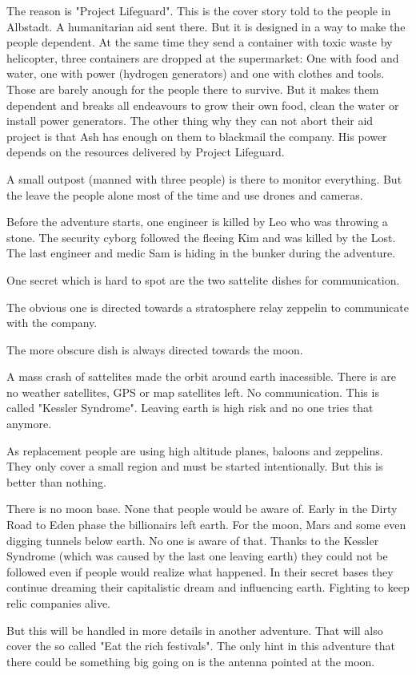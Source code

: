 The reason is "Project Lifeguard". This is the cover story told to the people in Albstadt. A humanitarian aid sent there. But it is designed in a way to make the people dependent. At the same time they send a container with toxic waste by helicopter, three containers are dropped at the supermarket: One with food and water, one with power (hydrogen generators) and one with clothes and tools.
Those are barely anough for the people there to survive. But it makes them dependent and breaks all endeavours to grow their own food, clean the water or install power generators.
The other thing why they can not abort their aid project is that Ash has enough on them to blackmail the company. His power depends on the resources delivered by Project Lifeguard.

A small outpost (manned with three people) is there to monitor everything. But the leave the people alone most of the time and use drones and cameras.

Before the adventure starts, one engineer is killed by Leo who was throwing a stone. The security cyborg followed the fleeing Kim and was killed by the Lost.
The last engineer and medic Sam is hiding in the bunker during the adventure.

One secret which is hard to spot are the two sattelite dishes for communication.

The obvious one is directed towards a stratosphere relay zeppelin to communicate with the company.

The more obscure dish is always directed towards the moon.

\begin{sidebarBox}[title=Kessler Syndrome]

    A mass crash of sattelites made the orbit around earth inacessible. There is are no weather satellites, GPS or map satellites left. No communication.
    This is called "Kessler Syndrome". Leaving earth is high risk and no one tries that anymore.

    As replacement people are using high altitude planes, baloons and zeppelins. They only cover a small region and must be started intentionally. But this is better than nothing.
\end{sidebarBox}


\begin{sidebarBox}[title=Moon base]

    There is no moon base. None that people would be aware of. Early in the Dirty Road to Eden phase the billionairs left earth. For the moon, Mars and some even digging tunnels below earth. No one is aware of that. Thanks to the Kessler Syndrome (which was caused by the last one leaving earth) they could not be followed even if people would realize what happened.
    In their secret bases they continue dreaming their capitalistic dream and influencing earth. Fighting to keep relic companies alive.

    But this will be handled in more details in another adventure. That will also cover the so called "Eat the rich festivals". The only hint in this adventure that there could be something big going on is the antenna pointed at the moon.
\end{sidebarBox}

